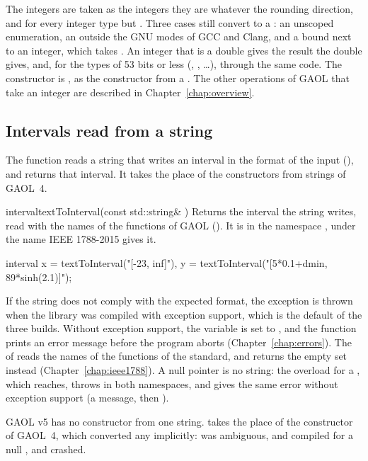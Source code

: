 \documentclass[12pt,a4paper,twoside,openright]{book}
\begin{document}
\begin{Rem}
%
The integers are taken as the integers they are whatever the rounding
direction, and for every integer type but .\newinvfive{} Three
cases still convert to a : an unscoped enumeration, an
 outside the GNU modes of GCC and Clang, and a  bound next to an integer, which takes .
An integer that is a double gives the result the double gives, and, for the
types of 53 bits or less (, , \ldots),
through the same code. The constructor  is
, as the constructor from a . The other
operations of GAOL that take an integer are described in
Chapter~\ref{chap:overview}.
\end{Rem}

\subsection{Intervals read from a string}

The function  reads a string that writes an interval
in the format of the input (), and returns that
interval. It takes the place of the constructors from strings of GAOL~4.

\begin{deffun}{interval}{textToInterval}{(const std::string\& )}
  Returns the interval the string  writes, read with the names of the
  functions of GAOL (). It is in the namespace
  , under the name IEEE 1788-2015 gives it.
  \begin{example}
interval x = textToInterval("[-23, inf]"),
         y = textToInterval("[5*0.1+dmin, 89*sinh(2.1)]");
  \end{example}
  If the string does not comply with the expected format, the exception
   is thrown when the library was compiled with
  exception support, which is the default of the three builds. Without exception
  support, the variable  is set to , and the function
   prints an error message before the program aborts
  (Chapter~\ref{chap:errors}). The  of
   reads the names of the functions of the standard, and
  returns the empty set instead (Chapter~\ref{chap:ieee1788}). A null pointer
  is no string: the overload for a , which
   reaches, throws 
  in both namespaces, and gives the same error without exception support (a
  message, then ).\newinvfive

  GAOL v5 has no constructor from one string.  takes
  the place of the constructor  of GAOL~4, which
  converted any  implicitly:  was
  ambiguous, and  compiled for a null , and
  crashed.\newinvfive
\end{deffun}
\end{document}
